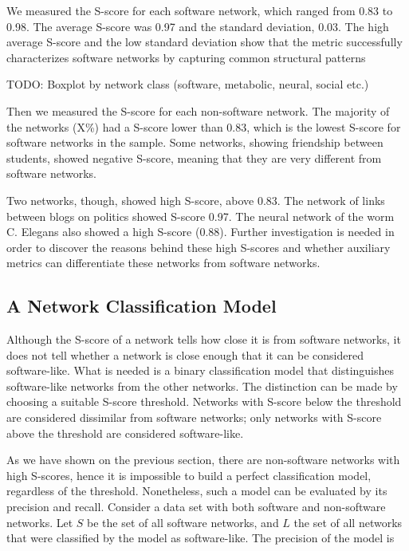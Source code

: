 We measured the S-score for each software network, which ranged from 0.83 to
0.98. The average S-score was 0.97 and the standard deviation, 0.03. The high
average S-score and the low standard deviation show that the metric successfully
characterizes software networks by capturing common structural patterns

TODO: Boxplot by network class (software, metabolic, neural, social etc.)

Then we measured the S-score for each non-software network. The majority of the
networks (X\%) had a S-score lower than 0.83, which is the lowest S-score for
software networks in the sample. Some networks, showing friendship between
students, showed negative S-score, meaning that they are very different from
software networks.

Two networks, though, showed high S-score, above 0.83. The network of links
between blogs on politics showed S-score 0.97. The neural network of the worm
C. Elegans also showed a high S-score (0.88). Further investigation is needed
in order to discover the reasons behind these high S-scores and whether
auxiliary metrics can differentiate these networks from software networks.

\subsection{A Network Classification Model} \label{sec:classmodel}

Although the S-score of a network tells how close it is from software networks,
it does not tell whether a network is close enough that it can be considered
software-like. What is needed is a binary classification model that
distinguishes software-like networks from the other networks. The distinction
can be made by choosing a suitable S-score threshold. Networks with S-score
below the threshold are considered dissimilar from software networks; only
networks with S-score above the threshold are considered software-like. 

As we have shown on the previous section, there are non-software networks with
high S-scores, hence it is impossible to build a perfect classification model,
regardless of the threshold. Nonetheless, such a model can be evaluated by its
precision and recall. Consider a data set with both software and non-software
networks. Let $S$ be the set of all software networks, and $L$ the set of all
networks that were classified by the model as software-like. The precision of
the model is

